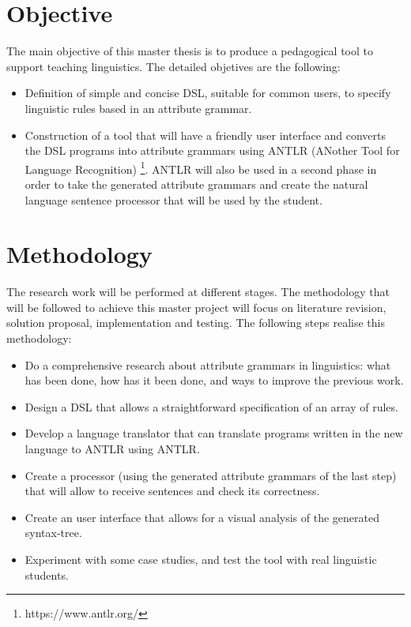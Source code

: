 	
\section{Objective}
The main objective of this master thesis is to produce a pedagogical tool to support teaching linguistics. The detailed objetives are the following:

\begin{itemize}
    \item Definition of simple and concise \textsc{DSL}, suitable for common users, to specify linguistic rules based in an attribute grammar.
	\item Construction of a tool that will have a friendly user interface and converts the \textsc{DSL} programs into attribute grammars using \textsc{ANTLR} (ANother Tool for Language Recognition) \footnote{https://www.antlr.org/}. \textsc{ANTLR} will also be used in a second phase in order to take the generated attribute grammars and create the natural language sentence processor that will be used by the student.
\end{itemize}
    
\section{Methodology}
The research work will be performed at different stages. The methodology that will be followed to achieve this master project will focus on literature revision, solution proposal, implementation and testing. The following steps realise this methodology:

\begin{itemize}
    \item Do a comprehensive research about attribute grammars in linguistics: what has been done, how has it been done, and ways to improve the previous work.
    \item Design a \textsc{DSL} that allows a straightforward specification of an array of rules.
	\item Develop a language translator that can translate programs written in the new language to \textsc{ANTLR} using \textsc{ANTLR}.
	\item Create a processor (using the generated attribute grammars of the last step) that will allow to receive sentences and check its correctness.
    \item Create an user interface that allows for a visual analysis of the generated syntax-tree.
    \item Experiment with some case studies, and test the tool with real linguistic students.
\end{itemize}
    
